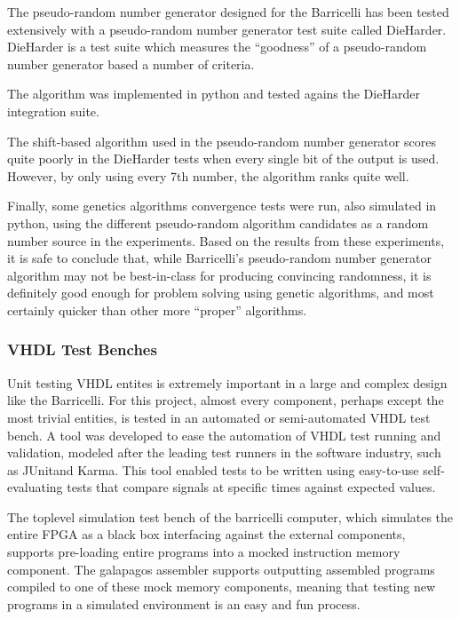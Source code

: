 The pseudo-random number generator designed for the Barricelli has been tested extensively with a pseudo-random number generator test suite called DieHarder\cn.
DieHarder is a test suite which measures the ``goodness'' of a pseudo-random number generator based a number of criteria.

The algorithm was implemented in python and tested agains the DieHarder integration suite\cn.

The shift-based algorithm used in the pseudo-random number generator scores quite poorly in the DieHarder tests when every single bit of the output is used.
However, by only using every 7th number\cn, the algorithm ranks quite well.

Finally, some genetics algorithms convergence tests were run, also simulated in python, using the different pseudo-random algorithm candidates as a random number source in the experiments.
Based on the results from these experiments, it is safe to conclude that, while Barricelli's pseudo-random number generator algorithm may not be best-in-class for producing convincing randomness, it is definitely good enough for problem solving using genetic algorithms, and most certainly quicker than other more ``proper'' algorithms.


\subsubsection{VHDL Test Benches}

Unit testing VHDL entites is extremely important in a large and complex design like the Barricelli.
For this project, almost every component, perhaps except the most trivial entities, is tested in an automated or semi-automated VHDL test bench.
A tool was developed to ease the automation of VHDL test running and validation, modeled after the leading test runners in the software industry, such as JUnit\cn and Karma\cn.
This tool enabled tests to be written using easy-to-use self-evaluating tests that compare signals at specific times against expected values.

The toplevel simulation test bench of the barricelli computer, which simulates the entire FPGA as a black box interfacing against the external components, supports pre-loading entire programs into a mocked instruction memory component.
The \Gls{galapagos assembler} supports outputting assembled programs compiled to one of these mock memory components, meaning that testing new programs in a simulated environment is an easy and fun process.


